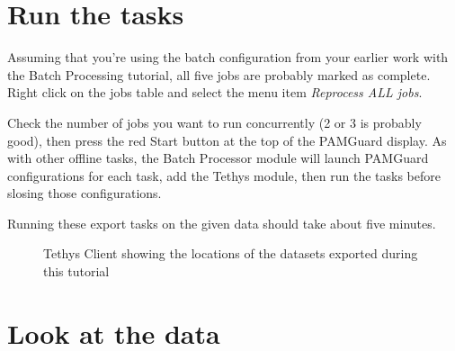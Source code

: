 \documentclass[
]{article}
\begin{document}
\section{Run the tasks}\label{run-the-tasks}

Assuming that you're using the batch configuration from your earlier
work with the Batch Processing tutorial, all five jobs are probably
marked as complete. Right click on the jobs table and select the menu
item \emph{Reprocess ALL jobs}.

Check the number of jobs you want to run concurrently (2 or 3 is
probably good), then press the red Start button at the top of the
PAMGuard display. As with other offline tasks, the Batch Processor
module will launch PAMGuard configurations for each task, add the Tethys
module, then run the tasks before slosing those configurations.

Running these export tasks on the given data should take about five
minutes.

\begin{figure}


\caption{\label{fig-client}Tethys Client showing the locations of the
datasets exported during this tutorial}

\end{figure}%

\section{Look at the data}\label{look-at-the-data}
\end{document}
